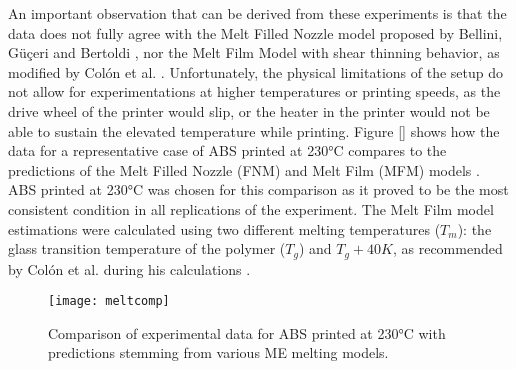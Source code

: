 \documentclass[main.tex]{subfiles}
\begin{document}
An important observation that can be derived from these experiments is that the data does not fully agree with the Melt Filled Nozzle model proposed by Bellini, Güçeri and Bertoldi \cite{Bellini2004}, nor the Melt Film Model with shear thinning behavior, as modified by Colón et al. \cite{ColonQuintana2020}. Unfortunately, the physical limitations of the setup do not allow for experimentations at higher temperatures or printing speeds, as the drive wheel of the printer would slip, or the heater in the printer would not be able to sustain the elevated temperature while printing. Figure \ref{} shows how the data for a representative case of ABS printed at 230°C compares to the predictions of the Melt Filled Nozzle (FNM) and Melt Film (MFM) models \cite{Bellini2004, OsswaldMelting18, ColonQuintana2020}. ABS printed at 230°C was chosen for this comparison as it proved to be the most consistent condition in all replications of the experiment. The Melt Film model estimations were calculated using two different melting temperatures ($T_m$): the glass transition temperature of the polymer ($T_g$) and $T_g+40K$, as recommended by Colón et al. during his calculations \cite{ColonQuintana2020}. 

\begin{figure}[!htbp]
	\center
	\texttt{[image: meltcomp]}
	\caption{Comparison of experimental data for ABS printed at 230°C with predictions stemming from various ME melting models.} \label{fig:meltmcomp}
\end{figure}

% 
%
%
\end{document}
